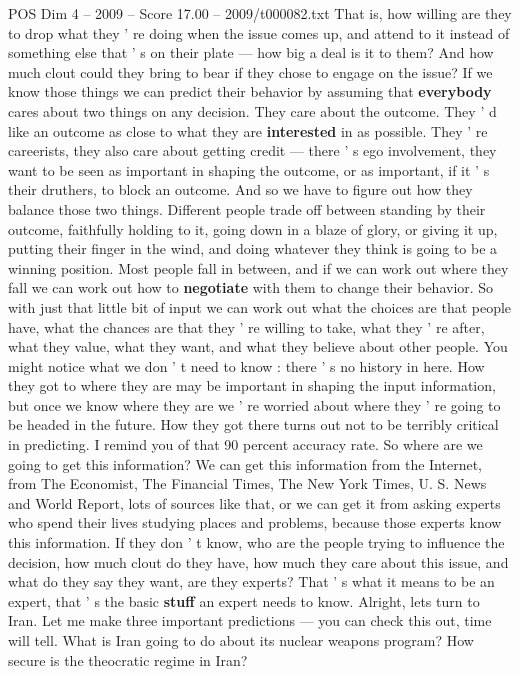 \begin{textsample}{POS Dim 4 – 2009 – Score 17.00 – 2009/t000082.txt}
That is, how willing are they to drop what they ' re doing when the issue comes up, and attend to it instead of something else that ' s on their plate — how big a deal is it to them?
And how much clout could they bring to bear if they chose to engage on the issue?
If we know those things we can predict their behavior by assuming that \textbf{everybody} cares about two things on any decision.
They care about the outcome.
They ' d like an outcome as close to what they are \textbf{interested} in as possible.
They ' re careerists, they also care about getting credit — there ' s ego involvement, they want to be seen as important in shaping the outcome, or as important, if it ' s their druthers, to block an outcome.
And so we have to figure out how they balance those two things.
Different people trade off between standing by their outcome, faithfully holding to it, going down in a blaze of glory, or giving it up, putting their finger in the wind, and doing whatever they think is going to be a winning position.
Most people fall in between, and if we can work out where they fall we can work out how to \textbf{negotiate} with them to change their behavior.
So with just that little bit of input we can work out what the choices are that people have, what the chances are that they ' re willing to take, what they ' re after, what they value, what they want, and what they believe about other people.
You might notice what we don ' t need to know : there ' s no history in here.
How they got to where they are may be important in shaping the input information, but once we know where they are we ' re worried about where they ' re going to be headed in the future.
How they got there turns out not to be terribly critical in predicting.
I remind you of that 90 percent accuracy rate.
So where are we going to get this information?
We can get this information from the Internet, from The Economist, The Financial Times, The New York Times, U.
S.
News and World Report, lots of sources like that, or we can get it from asking experts who spend their lives studying places and problems, because those experts know this information.
If they don ' t know, who are the people trying to influence the decision, how much clout do they have, how much they care about this issue, and what do they say they want, are they experts?
That ' s what it means to be an expert, that ' s the basic \textbf{stuff} an expert needs to know.
Alright, lets turn to Iran.
Let me make three important predictions — you can check this out, time will tell.
What is Iran going to do about its nuclear weapons program?
How secure is the theocratic regime in Iran?

\end{textsample}
